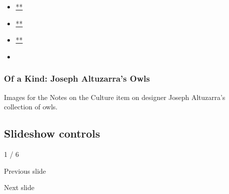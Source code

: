 \begin{itemize}
\item
  \href{https://www.facebookcorewwwi.onion/sharer.php?app_id=9869919170\&u=https\%3A\%2F\%2Fwww.nytimes3xbfgragh.onion\%2Fslideshow\%2F2019\%2F11\%2F08\%2Ft-magazine\%2Fof-a-kind-joseph-altuzarras-owls.html\%3Fsmid\%3Dfb-share\&name=Of\%20a\%20Kind\%3A\%20Joseph\%20Altuzarra\%E2\%80\%99s\%20Owls\&redirect_uri=https\%3A\%2F\%2Fwww.facebookcorewwwi.onion\%2F}{**}
\item
  \href{https://twitter.com/intent/tweet?url=https\%3A\%2F\%2Fwww.nytimes3xbfgragh.onion\%2Fslideshow\%2F2019\%2F11\%2F08\%2Ft-magazine\%2Fof-a-kind-joseph-altuzarras-owls.html\%3Fsmid\%3Dtw-share\&text=Of\%20a\%20Kind\%3A\%20Joseph\%20Altuzarra\%E2\%80\%99s\%20Owls}{**}
\item
  \href{mailto:?subject=nytimes3xbfgragh.onion\%3A\%20Of\%20a\%20Kind\%3A\%20Joseph\%20Altuzarra\%E2\%80\%99s\%20Owls\&body=From\%20The\%20New\%20York\%20Times\%3A\%0A\%0AOf\%20a\%20Kind\%3A\%20Joseph\%20Altuzarra\%E2\%80\%99s\%20Owls\%0A\%0AImages\%20for\%20the\%20Notes\%20on\%20the\%20Culture\%20item\%20on\%20designer\%20Joseph\%20Altuzarra\%E2\%80\%99s\%20collection\%20of\%20owls.\%0A\%0Ahttps\%3A\%2F\%2Fwww.nytimes3xbfgragh.onion\%2Fslideshow\%2F2019\%2F11\%2F08\%2Ft-magazine\%2Fof-a-kind-joseph-altuzarras-owls.html\%3Fsmid\%3Dem-share}{**}
\item
\end{itemize}

\hypertarget{of-a-kind-joseph-altuzarras-owls-1}{%
\subsubsection{Of a Kind: Joseph Altuzarra's
Owls}\label{of-a-kind-joseph-altuzarras-owls-1}}

Images for the Notes on the Culture item on designer Joseph Altuzarra's
collection of owls.

\hypertarget{slideshow-controls}{%
\subsection{Slideshow controls}\label{slideshow-controls}}

1 / 6

Previous slide

Next slide
